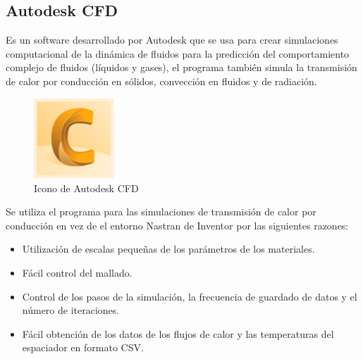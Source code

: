 \subsection{Autodesk CFD}
Es un software desarrollado por Autodesk que se usa para crear simulaciones computacional de la dinámica de fluidos para la predicción del comportamiento complejo de fluidos (líquidos y gases), el programa también simula la transmisión de calor por conducción en sólidos, convección en fluidos y de radiación. \\
\begin{figure}[H]
	\centering
		\includegraphics[width=3cm]{figuras/CFD.png}
	\caption{Icono de Autodesk CFD}
	\label{fig:CFD}
\end{figure}
Se utiliza el programa para las simulaciones de transmisión de calor por conducción en vez de el entorno Nastran de Inventor por las siguientes razones:
\begin{itemize}
	\item Utilización de escalas pequeñas de los parámetros de los materiales.
	\item Fácil control del mallado.
	\item Control de los pasos de la simulación, la frecuencia de guardado de datos y el número de iteraciones.
	\item Fácil obtención de los datos de los flujos de calor y las temperaturas del espaciador en formato CSV.
\end{itemize}

